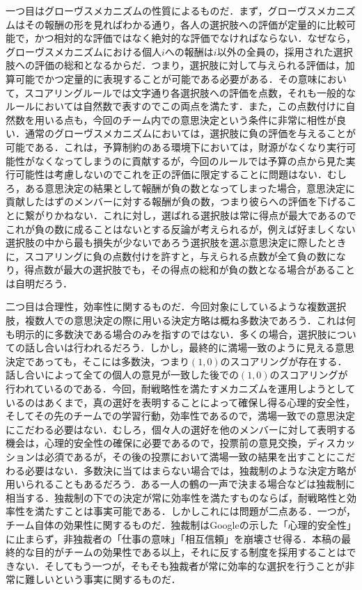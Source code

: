 \documentclass[a4paper, 11pt]{jsarticle}
\begin{document}
一つ目はグローヴスメカニズムの性質によるものだ．まず，グローヴスメカニズムはその報酬の形を見ればわかる通り，各人の選択肢への評価が定量的に比較可能で，かつ相対的な評価ではなく絶対的な評価でなければならない．なぜなら，グローヴスメカニズムにおける個人\(i\)への報酬は\(i\)以外の全員の，採用された選択肢への評価の総和となるからだ．つまり，選択肢に対して与えられる評価は，加算可能でかつ定量的に表現することが可能である必要がある．その意味において，スコアリングルールでは文字通り各選択肢への評価を点数，それも一般的なルールにおいては自然数で表すのでこの両点を満たす．また，この点数付けに自然数を用いる点も，今回のチーム内での意思決定という条件に非常に相性が良い．通常のグローヴスメカニズムにおいては，選択肢に負の評価を与えることが可能である．これは，予算制約のある環境下においては，財源がなくなり実行可能性がなくなってしまうのに貢献するが，今回のルールでは予算の点から見た実行可能性は考慮しないのでこれを正の評価に限定することに問題はない．むしろ，ある意思決定の結果として報酬が負の数となってしまった場合，意思決定に貢献したはずのメンバーに対する報酬が負の数，つまり彼らへの評価を下げることに繋がりかねない．これに対し，選ばれる選択肢は常に得点が最大であるのでこれが負の数に成ることはないとする反論が考えられるが，例えば好ましくない選択肢の中から最も損失が少ないであろう選択肢を選ぶ意思決定に際したときに，スコアリングに負の点数付けを許すと，与えられる点数が全て負の数になり，得点数が最大の選択肢でも，その得点の総和が負の数となる場合があることは自明だろう．

二つ目は合理性，効率性に関するものだ．今回対象にしているような複数選択肢，複数人での意思決定の際に用いる決定方略は概ね多数決であろう．これは何も明示的に多数決である場合のみを指すのではない．多くの場合，選択肢についての話し合いは行われるだろう．しかし，最終的に満場一致のように見える意思決定であっても，そこには多数決，つまり\((1,0)\)のスコアリングが存在する．話し合いによって全ての個人の意見が一致した後での\((1,0)\)のスコアリングが行われているのである．今回，耐戦略性を満たすメカニズムを運用しようとしているのはあくまで，真の選好を表明することによって確保し得る心理的安全性，そしてその先のチームでの学習行動，効率性であるので，満場一致での意思決定にこだわる必要はない．むしろ，個々人の選好を他のメンバーに対して表明する機会は，心理的安全性の確保に必要であるので，投票前の意見交換，ディスカッションは必須であるが，その後の投票において満場一致の結果を出すことにこだわる必要はない．多数決に当てはまらない場合では，独裁制のような決定方略が用いられることもあるだろう．ある一人の鶴の一声で決まる場合などは独裁制に相当する．独裁制の下での決定が常に効率性を満たすものならば，耐戦略性と効率性を満たすことは事実可能である．しかしこれには問題が二点ある．一つが，チーム自体の効果性に関するものだ．独裁制はGoogle\cite{Google}の示した「心理的安全性」に止まらず，非独裁者の「仕事の意味」「相互信頼」を崩壊させ得る．本稿の最終的な目的がチームの効果性である以上，それに反する制度を採用することはできない．そしてもう一つが，そもそも独裁者が常に効率的な選択を行うことが非常に難しいという事実に関するものだ．
\end{document}
